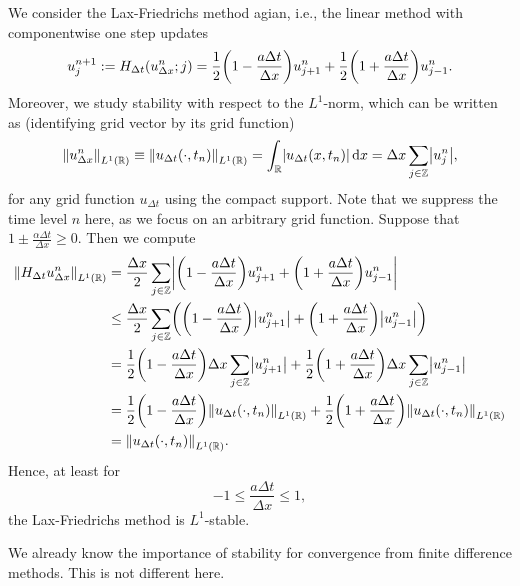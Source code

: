 \begin{example}
	We consider the Lax-Friedrichs method agian, i.e., the linear method with componentwise one step updates
	\[
		u_j^{n + 1} := H_{\Delta t}\parentheses*{u_{\Delta x}^n; j} = \frac{1}{2}\parentheses*{1 - \frac{a\Delta t}{\Delta x}}u_{j + 1}^n + \frac{1}{2}\parentheses*{1 + \frac{a\Delta t}{\Delta x}}u_{j - 1}^n.
	\]
	Moreover, we study stability with respect to the \(L^1\)-norm, which can be written as (identifying grid vector by its grid function)
	\[
		\norm*{u_{\Delta x}^n}_{L^1\parentheses*{\R}} \equiv \norm*{u_{\Delta t}\parentheses*{\cdot, t_n}}_{L^1\parentheses*{\R}} = \int_\R \absolute*{u_{\Delta t}\parentheses*{x, t_n}}\d x = \Delta x\sum_{j \in \Z}\absolute*{u_j^n},
	\]
	for any grid function \(u_{\Delta t}\) using the compact support.
	Note that we suppress the time level \(n\) here, as we focus on an arbitrary grid function.
	Suppose that \(1 \pm \frac{\alpha\Delta t}{\Delta x} \ge 0\).
	Then we compute
	\begin{align*}
		\norm*{H_{\Delta t}u_{\Delta x}^n}_{L^1\parentheses*{\R}} &= \frac{\Delta x}{2}\sum_{j \in \Z}\absolute*{\parentheses*{1 - \frac{a\Delta t}{\Delta x}}u_{j + 1}^n + \parentheses*{1 + \frac{a\Delta t}{\Delta x}}u_{j - 1}^n}\\
		&\le \frac{\Delta x}{2}\sum_{j \in \Z}\parentheses*{\parentheses*{1 - \frac{a\Delta t}{\Delta x}}\absolute*{u_{j + 1}^n} + \parentheses*{1 + \frac{a\Delta t}{\Delta x}}\absolute*{u_{j - 1}^n}}\\
		&= \frac{1}{2}\parentheses*{1 - \frac{a\Delta t}{\Delta x}}\Delta x\sum_{j \in \Z}\absolute*{u_{j + 1}^n} + \frac{1}{2}\parentheses*{1 + \frac{a\Delta t}{\Delta x}}\Delta x\sum_{j \in \Z}\absolute*{u_{j - 1}^n}\\
		&= \frac{1}{2}\parentheses*{1 - \frac{a\Delta t}{\Delta x}}\norm*{u_{\Delta t}\parentheses*{\cdot, t_n}}_{L^1\parentheses*{\R}} + \frac{1}{2}\parentheses*{1 + \frac{a\Delta t}{\Delta x}}\norm*{u_{\Delta t}\parentheses*{\cdot, t_n}}_{L^1\parentheses*{\R}}\\
		&= \norm*{u_{\Delta t}\parentheses*{\cdot, t_n}}_{L^1\parentheses*{\R}}.
	\end{align*}
	Hence, at least for
	\[
		-1 \le \frac{a\Delta t}{\Delta x} \le 1,
	\]
	the Lax-Friedrichs method is \(L^1\)-stable.
\end{example}

We already know the importance of stability for convergence from finite difference methods.
This is not different here.

